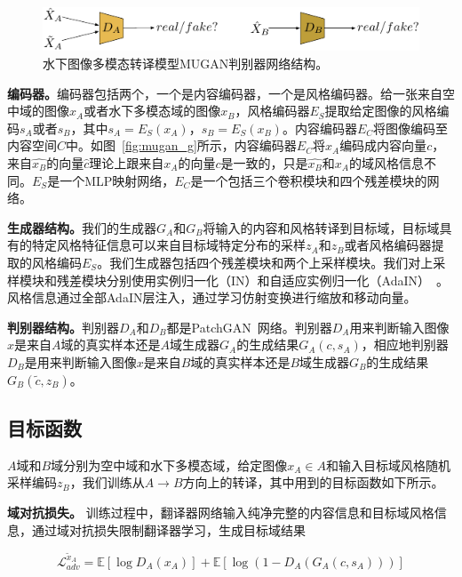 \begin{figure}[ht]
    \centering
    \includegraphics[width=1\textwidth]{figures/D.pdf}
    \caption{水下图像多模态转译模型MUGAN判别器网络结构。}
    \label{fig:mugan_d}
\end{figure}

\textbf{编码器。}编码器包括两个，一个是内容编码器，一个是风格编码器。给一张来自空中域的图像$x_A$或者水下多模态域的图像$x_B$，风格编码器$E_S$提取给定图像的风格编码$s_A$或者$s_B$，其中$s_A = E_S(x_A)$，$s_B = E_S(x_B)$。内容编码器$E_C$将图像编码至内容空间$C$中。如图~\ref{fig:mugan_g}所示，内容编码器$E_C$将$x_A$编码成内容向量$c$，来自$\hat{x_B}$的向量$\hat{c}$理论上跟来自$x_A$的向量$c$是一致的，只是$\hat{x_B}$和$x_A$的域风格信息不同。$E_S$是一个MLP映射网络，$E_C$是一个包括三个卷积模块和四个残差模块的网络。

\textbf{生成器结构。}我们的生成器$G_A$和$G_B$将输入的内容和风格转译到目标域，目标域具有的特定风格特征信息可以来自目标域特定分布的采样$z_A$和$z_B$或者风格编码器提取的风格编码$E_S$。我们生成器包括四个残差模块和两个上采样模块。我们对上采样模块和残差模块分别使用实例归一化（IN）和自适应实例归一化（AdaIN）~\cite{huang2017arbitrary}。风格信息通过全部AdaIN层注入，通过学习仿射变换进行缩放和移动向量。

\textbf{判别器结构。}判别器$D_A$和$D_B$都是PatchGAN~\cite{isola2017image}网络。判别器$D_A$用来判断输入图像$x$是来自$A$域的真实样本还是$A$域生成器$G_A$的生成结果$G_A(c,s_A)$，相应地判别器$D_B$是用来判断输入图像$x$是来自$B$域的真实样本还是$B$域生成器$G_B$的生成结果$G_B(\tilde{c},z_B)$。

\subsection{目标函数}
$A$域和$B$域分别为空中域和水下多模态域，给定图像$x_A \in A$和输入目标域风格随机采样编码$z_B$，我们训练从$A \rightarrow B$方向上的转译，其中用到的目标函数如下所示。

\textbf{域对抗损失。} 训练过程中，翻译器网络输入纯净完整的内容信息和目标域风格信息，通过域对抗损失限制翻译器学习，生成目标域结果

\begin{equation}
\label{equ:adv_a_}
\mathcal{L}_{adv}^{\tilde{x}_A} = \mathbb{E}[\log D_A(x_A)] + \mathbb{E}[\log(1-D_A(G_A(c,s_A)))]
\end{equation}

